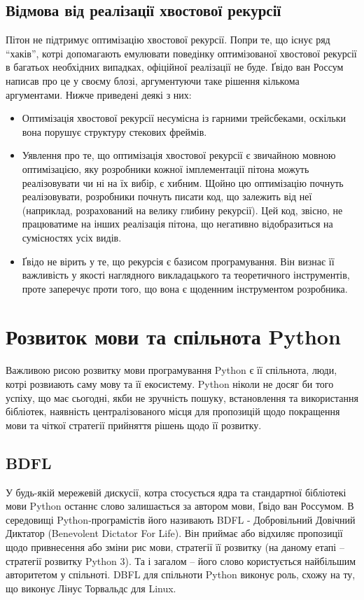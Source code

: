 \documentclass[a4paper, 12pt, onsedie]{article}
\begin{document}
\subsection{Відмова від реалізації хвостової рекурсії}
    Пітон не підтримує оптимізацію хвостової рекурсії. Попри те, що існує ряд ``хаків'', котрі
    допомагають емулювати поведінку оптимізованої хвостової рекурсії в багатьох необхідних
    випадках, офіційної реалізації не буде. Ґвідо ван Россум написав про це у своєму блозі,
    аргументуючи таке рішення кількома аргументами. Нижче приведені деякі з них:
     \begin{itemize}
        \item Оптимізація хвостової рекурсії несумісна із гарними трейсбеками, оскільки вона
        порушує структуру стекових фреймів.
        \item Уявлення про те, що оптимізація хвостової рекурсії є звичайною мовною 
        оптимізацією, яку розробники кожної імплементації пітона можуть реалізовувати чи ні на 
        їх вибір, є хибним. Щойно цю оптимізацію почнуть реалізовувати, розробники почнуть 
        писати код, що залежить від неї (наприклад, розрахований на велику глибину рекурсії). 
        Цей код, звісно, не працюватиме на інших реалізація пітона, що негативно відобразиться 
        на сумісностях усіх видів.
        \item Ґвідо не вірить у те, що рекурсія є базисом програмування. Він визнає її 
        важливість у якості наглядного викладацького та теоретичного інструментів, проте 
        заперечує проти того, що вона є щоденним інструментом розробника.
     \end{itemize}


\section{Розвиток мови та спільнота Python}
    Важливою рисою розвитку мови програмування Python є її спільнота, люди, котрі розвиають саму
    мову та її екосистему. Python ніколи не досяг би того успіху, що має сьогодні, якби не
    зручність пошуку, встановлення та використання бібліотек, наявність централізованого
    місця для пропозицій щодо покращення мови та чіткої стратегії прийняття рішень щодо її
    розвитку. 

\subsection{BDFL}
    У будь-якій мережевій дискусії, котра стосується ядра та стандартної бібліотекі мови Python
    останнє слово залишається за автором мови, Ґвідо ван Россумом. В середовищі Python-програмістів
    його називають BDFL - Добровільний Довічний Диктатор (Benevolent Dictator For Life). Він приймає або
    відхиляє пропозиції щодо привнесення або зміни рис мови, стратегії її розвитку (на даному етапі -- 
    стратегії розвитку Python 3). Та і загалом -- його слово користується найбільшим авторитетом у
    спільноті. DBFL для спільноти Python виконує роль, схожу на ту, що виконує Лінус Торвальдс для
    Linux.
\end{document}

